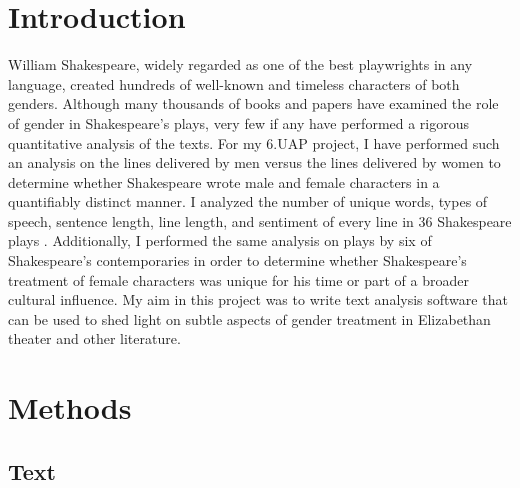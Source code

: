 \documentclass[12pt]{article} %
\begin{document}
\tableofcontents %

\newpage %


\section{Introduction} %

	William Shakespeare, widely regarded as one of the best playwrights in any language, created hundreds of well-known and timeless characters of both genders. Although many thousands of books and papers have examined the role of gender in Shakespeare’s plays, very few if any have performed a rigorous quantitative analysis of the texts. For my 6.UAP project, I have performed such an analysis on the lines delivered by men versus the lines delivered by women to determine whether Shakespeare wrote male and female characters in a quantifiably distinct manner. I analyzed the number of unique words, types of speech, sentence length, line length, and sentiment of every line in 36 Shakespeare plays . Additionally, I performed the same analysis on plays by six of Shakespeare’s contemporaries in order to determine whether Shakespeare’s treatment of female characters was unique for his time or part of a broader cultural influence. My aim in this project was to write text analysis software that can be used to shed light on subtle aspects of gender treatment in Elizabethan theater and other literature.


\section{Methods} %



\subsection{Text} %
\end{document}
